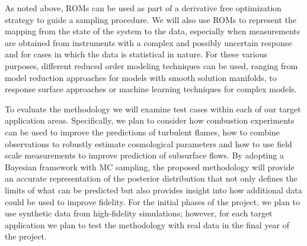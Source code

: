 \documentclass[11pt]{article}
\begin{document}
As noted above, ROMs can be used as
part of a derivative free optimization strategy
to guide a sampling procedure. We will also use ROMs to represent the mapping from the state of the system
to the data, especially when measurements are obtained from instruments with a complex and possibly uncertain response and for cases in which the data is statistical in nature. For these various purposes, different reduced order modeling techniques can be used, ranging from model reduction approaches for models with smooth solution manifolds, to response surface approaches or machine learning techniques for complex models.

To evaluate the methodology we will examine test cases within each of our target application areas.
Specifically, we plan to consider how combustion experiments can be used to improve
the predictions of turbulent flames,
how to combine observations to robustly estimate cosmological parameters
and how to use field scale measurements to improve prediction of subsurface
flows.
By adopting a Bayesian framework with MC sampling, the proposed methodology will provide an accurate representation of the posterior distribution that not only defines the limits of what can be predicted but also provides insight into how additional data could be used to improve fidelity. For the initial phases of the project, we plan to use synthetic data from high-fidelity simulations; however, for each target application we
plan to test the methodology with real data in the final year of the project.
\end{document}
